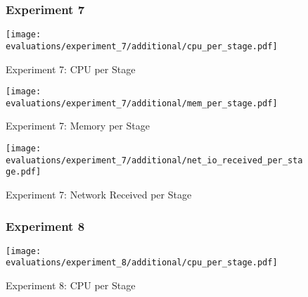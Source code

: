 \pagebreak

\begin{figure}[p]
    \subsubsection{Experiment 7}
    \begin{adjustwidth}{-0.2\paperwidth}{-0.2\paperwidth}
        \centering
        \texttt{[image: evaluations/experiment\_7/additional/cpu\_per\_stage.pdf]}
        \caption{Experiment 7: CPU per Stage}
        \label{fig:eval_7_cpu_per_stage}
    \end{adjustwidth}
\end{figure}

\begin{figure}[p]
    \begin{adjustwidth}{-0.2\paperwidth}{-0.2\paperwidth}
        \centering
        \texttt{[image: evaluations/experiment\_7/additional/mem\_per\_stage.pdf]}
        \caption{Experiment 7: Memory per Stage}
        \label{fig:eval_7_mem_per_stage}
    \end{adjustwidth}
\end{figure}

\begin{figure}[p]
    \begin{adjustwidth}{-0.2\paperwidth}{-0.2\paperwidth}
        \centering
        \texttt{[image: evaluations/experiment\_7/additional/net\_io\_received\_per\_stage.pdf]}
        \caption{Experiment 7: Network Received per Stage}
        \label{fig:eval_7_net_received_per_stage}
    \end{adjustwidth}
\end{figure}

\pagebreak

\begin{figure}[p]
    \subsubsection{Experiment 8}
    \begin{adjustwidth}{-0.2\paperwidth}{-0.2\paperwidth}
        \centering
        \texttt{[image: evaluations/experiment\_8/additional/cpu\_per\_stage.pdf]}
        \caption{Experiment 8: CPU per Stage}
        \label{fig:eval_8_cpu_per_stage}
    \end{adjustwidth}
\end{figure}

